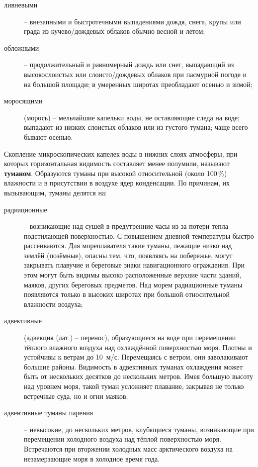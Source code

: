 \begin{description}
\item[ливневыми] \--- внезапными и быстротечными выпадениями дождя,
  снега, крупы или града из кучево\-/дождевых облаков обычно весной и
  летом;
\item[обложными] \--- продолжительный и равномерный дождь или снег,
  выпадающий из высокослоистых или слоисто\-/дождевых облаков при
  пасмурной погоде и на большой площади; в умеренных широтах
  преобладают осенью и зимой;
\item[моросящими] (морось) \--- мельчайшие капельки воды, не
  оставляющие следа на воде; выпадают из низких слоистых облаков или
  из густого тумана; чаще всего бывают осенью.
\end{description}

Скопление микроскопических капелек воды в нижних слоях атмосферы, при
которых горизонтальная видимость составляет менее полумили, называют
\textbf{туманом}. Образуются туманы при высокой относительной (около
100\,\%) влажности и в присутствии в воздухе ядер конденсации. По
причинам, их вызывающим, туманы делятся на:

\begin{description}
\item[радиационные] \--- возникающие над сушей в предутренние часы
  из-за потери тепла подстилающей поверхностью.  С повышением дневной
  температуры быстро рассеиваются. Для мореплавателя такие туманы,
  лежащие низко над землёй (позёмные), опасны тем, что, появляясь на
  побережье, могут закрывать плавучие и береговые знаки навигационного
  ограждения. При этом могут быть видимы высоко расположенные верхние
  части зданий, маяков, других береговых предметов. Над морем
  радиационные туманы появляются только в высоких широтах при большой
  относительной влажности воздуха;
\item[адвективные] (адвекция (лат.) \--- перенос), образующиеся на
  воде при перемещении тёплого влажного воздуха над охлаждённой
  поверхностью моря. Плотны и устойчивы к ветрам до
  10~м/с. Перемещаясь с ветром, они заволакивают большие
  районы. Видимость в адвективных туманах охлаждения может быть от
  нескольких десятков до нескольких метров. Имея большую высоту над
  уровнем моря, такой туман усложняет плавание, закрывая не только
  встречные суда, но и огни маяков;
\item[адвентивные туманы парения] \--- невысокие, до нескольких
  метров, клубящиеся туманы, возникающие при перемещении холодного
  воздуха над тёплой поверхностью моря. Встречаются при вторжении
  холодных масс арктического воздуха на незамерзающие моря в холодное
  время года.
\end{description}

